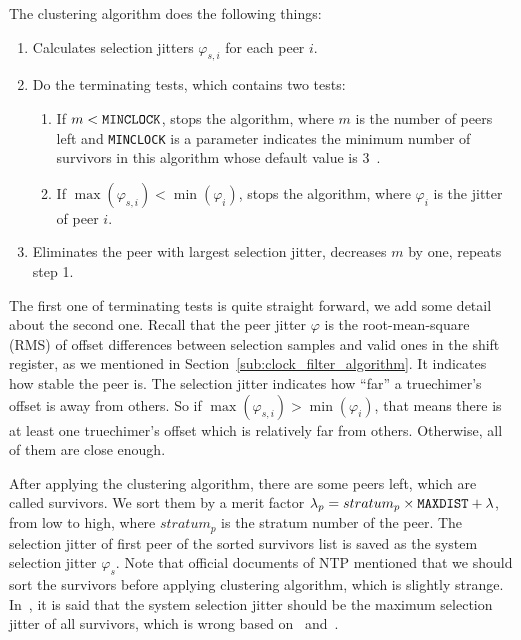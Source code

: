 The clustering algorithm does the following things:
\begin{enumerate}
    \item Calculates selection jitters $\varphi_{s, i}$ for each peer $i$.
    \item Do the terminating tests, which contains two tests:
        \begin{enumerate}
            \item If $m < \verb|MINCLOCK|$, stops the algorithm, where $m$ is
                the number of peers left and \verb|MINCLOCK| is a parameter
                indicates the minimum number of survivors in this algorithm
                whose default value is 3~\cite{rfc5905}.
            \item If $\max(\varphi_{s,i}) < \min(\varphi_i)$, stops the
                algorithm, where $\varphi_i$ is the jitter of peer $i$.
        \end{enumerate}
    \item Eliminates the peer with largest selection jitter, decreases $m$
        by one, repeats step 1.
\end{enumerate}
The first one of terminating tests is quite straight forward, we add some
detail about the second one. Recall that the peer jitter $\varphi$ is the
root-mean-square (RMS) of offset differences between selection samples and
valid ones in the shift register, as we mentioned in
Section~\ref{sub:clock_filter_algorithm}. It indicates how stable the peer is.
The selection jitter indicates how ``far'' a truechimer's offset is away from
others.  So if $\max(\varphi_{s,i}) > \min(\varphi_i)$, that means there is at
least one truechimer's offset which is relatively far from others. Otherwise,
all of them are close enough.

After applying the clustering algorithm, there are some peers left, which are
called survivors. We sort them by a merit factor $\lambda_p = stratum_p \times
\verb|MAXDIST| + \lambda$, from low to high, where $stratum_p$ is the stratum
number of the peer. The selection jitter of first peer of the sorted survivors
list is saved as the system selection jitter $\varphi_s$. Note that official
documents of NTP mentioned that we should sort the survivors before applying
clustering algorithm, which is slightly strange. In~\cite{rfc5905}, it is said
that the system selection jitter should be the maximum selection jitter of all
survivors, which is wrong based on~\cite{redbook} and~\cite{source_code}.

